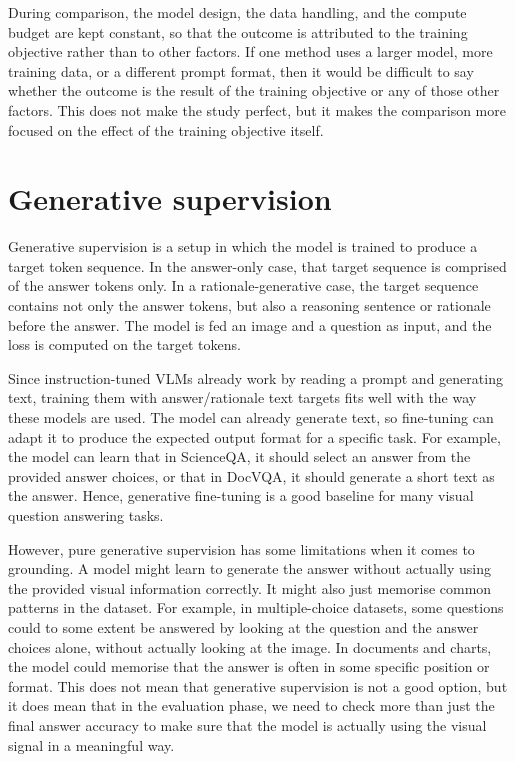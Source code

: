 \documentclass[12pt,bibliography=totoc,listof=totoc,BCOR=5mm,DIV=12,oneside,open=any]{scrbook}
\begin{document}
During comparison, the model design, the data handling, and the compute budget are kept constant, so that the outcome is attributed to the training objective rather than to other factors.
If one method uses a larger model, more training data, or a different prompt format, then it would be difficult to say whether the outcome is the result of the training objective or any of those other factors.
This does not make the study perfect, but it makes the comparison more focused on the effect of the training objective itself.


\section{Generative supervision}
Generative supervision is a setup in which the model is trained to produce a target token sequence.
In the answer-only case, that target sequence is comprised of the answer tokens only.
In a rationale-generative case, the target sequence contains not only the answer tokens, but also a reasoning sentence or rationale before the answer.
The model is fed an image and a question as input, and the loss is computed on the target tokens.

Since instruction-tuned VLMs already work by reading a prompt and generating text,
training them with answer/rationale text targets fits well with the way these models are used.
The model can already generate text, so fine-tuning can adapt it to produce the expected output format for a specific task.
For example, the model can learn that in ScienceQA, it should select an answer from the provided answer choices,
or that in DocVQA, it should generate a short text as the answer.
Hence, generative fine-tuning is a good baseline for many visual question answering tasks.

However, pure generative supervision has some limitations when it comes to grounding.
A model might learn to generate the answer without actually using the provided visual information correctly.
It might also just memorise common patterns in the dataset.
For example, in multiple-choice datasets, some questions could to some extent be answered by looking at the question and the answer choices alone,
without actually looking at the image.
In documents and charts, the model could memorise that the answer is often in some specific position or format.
This does not mean that generative supervision is not a good option, but it does mean that in the evaluation phase, we need to check more than just the final answer accuracy
to make sure that the model is actually using the visual signal in a meaningful way.
\end{document}
